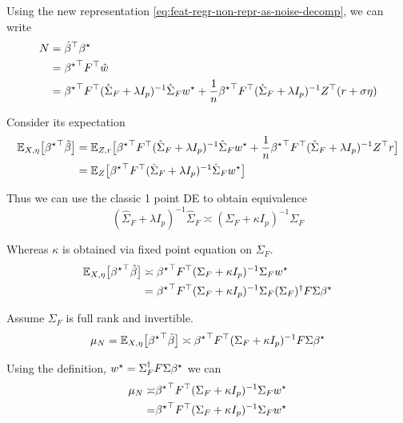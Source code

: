 Using the new representation \ref{eq:feat-regr-non-repr-as-noise-decomp},
we can write
\begin{align*}
N & ={\hat{\beta}}^{\top}{\beta^{\star}}\\
 & ={{\beta^{\star}}}^{\top}F^{\top}\hat{w}\\
 & ={{\beta^{\star}}}^{\top}F^{\top}(\hat{\Sigma}_{F}+\lambda I_{p})^{-1}\hat{\Sigma}_{F}w^{\star}+\frac{1}{n}{{\beta^{\star}}}^{\top}F^{\top}(\hat{\Sigma}_{F}+\lambda I_{p})^{-1}Z^{\top}(r+\sigma\eta)
\end{align*}

Consider its expectation
\begin{align*}
\mathbb{E}_{X,\eta}\big[{{\beta^{\star}}}^{\top}\hat{\beta}\big] & =\mathbb{E}_{Z,r}\big[{{\beta^{\star}}}^{\top}F^{\top}(\hat{\Sigma}_{F}+\lambda I_{p})^{-1}\hat{\Sigma}_{F}w^{\star}+\frac{1}{n}{{\beta^{\star}}}^{\top}F^{\top}(\hat{\Sigma}_{F}+\lambda I_{p})^{-1}Z^{\top}r\big]\\
 & =\mathbb{E}_{Z}\big[{{\beta^{\star}}}^{\top}F^{\top}(\hat{\Sigma}_{F}+\lambda I_{p})^{-1}\hat{\Sigma}_{F}w^{\star}\big]
\end{align*}

Thus we can use the classic 1 point DE to obtain equivalence
\[
(\hat{\Sigma}_{F}+\lambda I_{p})^{-1}\hat{\Sigma}_{F}\asymp(\Sigma_{F}+\kappa I_{p})^{-1}\Sigma_{F}
\]

Whereas $\kappa$ is obtained via fixed point equation on $\Sigma_{F}$.
\begin{align*}
\mathbb{E}_{X,\eta}\big[{{\beta^{\star}}}^{\top}\hat{\beta}\big] & \asymp{{\beta^{\star}}}^{\top}F^{\top}(\Sigma_{F}+\kappa I_{p})^{-1}\Sigma_{F}w^{\star}\\
 & ={{\beta^{\star}}}^{\top}F^{\top}(\Sigma_{F}+\kappa I_{p})^{-1}\Sigma_{F}(\Sigma_{F})^{\dagger}F\Sigma{\beta^{\star}}
\end{align*}

Assume $\Sigma_{F}$ is full rank and invertible.
\begin{equation}
\mu_{N}=\mathbb{E}_{X,\eta}\big[{{\beta^{\star}}}^{\top}\hat{\beta}\big]\asymp{{\beta^{\star}}}^{\top}F^{\top}(\Sigma_{F}+\kappa I_{p})^{-1}F\Sigma{\beta^{\star}}\label{eq:feat_space_acc_N_expectation_DE}
\end{equation}

Using the definition, $w^{\star}=\Sigma_{F}^{\dagger}F\Sigma{\beta^{\star}}$
we can
\begin{align*}
\mu_{N}\asymp & {{\beta^{\star}}}^{\top}F^{\top}(\Sigma_{F}+\kappa I_{p})^{-1}\Sigma_{F}w^{\star}\\
= & {{\beta^{\star}}}^{\top}F^{\top}(\Sigma_{F}+\kappa I_{p})^{-1}\Sigma_{F}w^{\star}
\end{align*}


